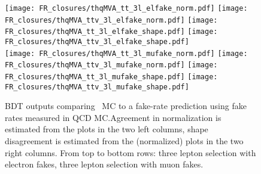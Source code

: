 \begin{figure}[htb]
\small
\centering
 \texttt{[image: FR\_closures/thqMVA\_tt\_3l\_elfake\_norm.pdf]} 
 \texttt{[image: FR\_closures/thqMVA\_ttv\_3l\_elfake\_norm.pdf]} 
 \texttt{[image: FR\_closures/thqMVA\_tt\_3l\_elfake\_shape.pdf]} 
 \texttt{[image: FR\_closures/thqMVA\_ttv\_3l\_elfake\_shape.pdf]} \\
 \texttt{[image: FR\_closures/thqMVA\_tt\_3l\_mufake\_norm.pdf]} 
 \texttt{[image: FR\_closures/thqMVA\_ttv\_3l\_mufake\_norm.pdf]} 
 \texttt{[image: FR\_closures/thqMVA\_tt\_3l\_mufake\_shape.pdf]} 
 \texttt{[image: FR\_closures/thqMVA\_ttv\_3l\_mufake\_shape.pdf]} 
\caption[Fake rates closure test in the $3l$ selection.]{BDT outputs comparing \ttbar\ MC to a fake-rate prediction using fake rates measured in QCD MC.\@ Agreement in normalization is estimated from the plots in the two left columns, shape disagreement is estimated from the (normalized) plots in the two right columns. From top to bottom rows: three lepton selection with electron fakes, three lepton selection with muon fakes.} 
\label{fig:frclosure_3l_elfake}
\end{figure}


